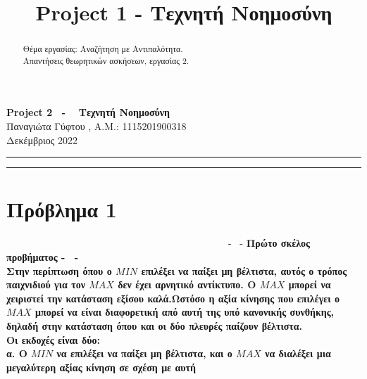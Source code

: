 \documentclass[10pt]{article}
\title{ \selectlanguage{english} Project 1 - \selectlanguage{greek} Τεχνητή Νοημοσύνη}
\begin{document}
   
   \begin{center}
        {\Large \textbf{ Project 2 \ - \  Τεχνητή Νοημοσύνη}}\\
        \vspace{1em}
        {\large Παναγιώτα Γύφτου ,   A.M.: 1115201900318  } \\
        \vspace{1em}
        {\large Δεκέμβριος 2022}
    \end{center}
    
    
    \begin{center}
        \rule{150mm}{0.2mm}
    \end{center}

    \begin{abstract}
    Θέμα εργασίας: Αναζήτηση με Αντιπαλότητα. \\ 
    
    Απαντήσεις θεωρητικών ασκήσεων, εργασίας 2.
    

    \end{abstract}

    \begin{center}
        \rule{150mm}{0.2mm}
    \end{center}

    \vspace{5mm}

\section*{Πρόβλημα 1}
\vspace{5mm}
\ \ \ \ \ \ \ \ \ \ \ \ \ \ \ \ 
\ \ \ \ \ \ \ \ \ \ \ \ \ \ \ \
\ \ \ \ \ \ \ \ \ \ \ \ \ - \ - \bf   Πρώτο σκέλος προβήματος \normalfont - \ - \\

Στην περίπτωση όπου ο $MIN$ επιλέξει να παίξει μη βέλτιστα, αυτός ο τρόπος παιχνιδιού  για τον $MAX$ δεν έχει αρνητικό αντίκτυπο. Ο $MAX$ μπορεί να χειριστεί την κατάσταση εξίσου καλά.Ωστόσο η αξία κίνησης που επιλέγει ο  $MAX$ μπορεί να είναι διαφορετική από αυτή της υπό κανονικής συνθήκης, δηλαδή στην κατάσταση όπου και οι δύο πλευρές παίζουν βέλτιστα. \\

Οι εκδοχές είναι δύο: \\

α. Ο  $MIN$  να επιλέξει να παίξει μη βέλτιστα, και ο $MAX$ να διαλέξει μια μεγαλύτερη αξίας κίνηση σε σχέση με αυτή
\end{document}
